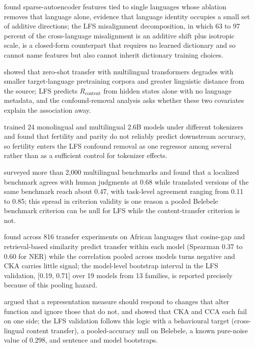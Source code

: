 \documentclass[11pt,a4paper]{article}
\begin{document}
\citet{deng2025unveiling} found sparse-autoencoder features tied to single languages whose ablation removes that language alone, evidence that language identity occupies a small set of additive directions; the LFS misalignment decomposition, in which 63 to 97 percent of the cross-language misalignment is an additive shift plus isotropic scale, is a closed-form counterpart that requires no learned dictionary and so cannot name features but also cannot inherit dictionary training choices.

\citet{lauscher2020hero} showed that zero-shot transfer with multilingual transformers degrades with smaller target-language pretraining corpora and greater linguistic distance from the source; LFS predicts $R_{\mathrm{content}}$ from hidden states alone with no language metadata, and the confound-removal analysis asks whether these two covariates explain the association away.

\citet{ali2024tokenizer} trained 24 monolingual and multilingual 2.6B models under different tokenizers and found that fertility and parity do not reliably predict downstream accuracy, so fertility enters the LFS confound removal as one regressor among several rather than as a sufficient control for tokenizer effects.

\citet{wu2025bitter} surveyed more than 2,000 multilingual benchmarks and found that a localized benchmark agrees with human judgments at 0.68 while translated versions of the same benchmark reach about 0.47, with task-level agreement ranging from 0.11 to 0.85; this spread in criterion validity is one reason a pooled Belebele benchmark criterion can be null for LFS while the content-transfer criterion is not.

\citet{idris2026embedding} found across 816 transfer experiments on African languages that cosine-gap and retrieval-based similarity predict transfer within each model (Spearman 0.37 to 0.60 for NER) while the correlation pooled across models turns negative and CKA carries little signal; the model-level bootstrap interval in the LFS validation, [0.19, 0.71] over 19 models from 13 families, is reported precisely because of this pooling hazard.

\citet{ding2021grounding} argued that a representation measure should respond to changes that alter function and ignore those that do not, and showed that CKA and CCA each fail on one side; the LFS validation follows this logic with a behavioural target (cross-lingual content transfer), a pooled-accuracy null on Belebele, a known pure-noise value of 0.298, and sentence and model bootstraps.
\end{document}
